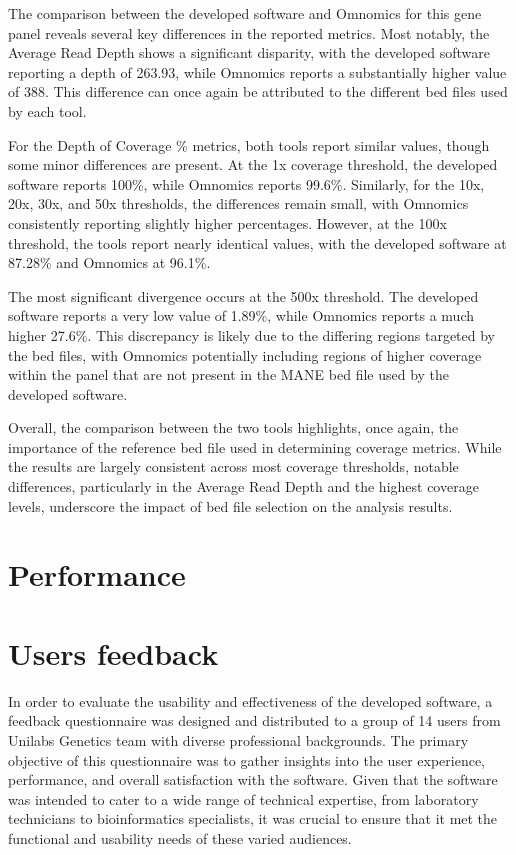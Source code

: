     The comparison between the developed software and Omnomics for this gene panel reveals several key differences in the reported metrics. Most notably, the Average Read Depth shows a significant disparity, with the developed software reporting a depth of 263.93, while Omnomics reports a substantially higher value of 388. This difference can once again be attributed to the different \ac{bed} files used by each tool.
    
    For the Depth of Coverage \% metrics, both tools report similar values, though some minor differences are present. At the 1x coverage threshold, the developed software reports 100\%, while Omnomics reports 99.6\%. Similarly, for the 10x, 20x, 30x, and 50x thresholds, the differences remain small, with Omnomics consistently reporting slightly higher percentages. However, at the 100x threshold, the tools report nearly identical values, with the developed software at 87.28\% and Omnomics at 96.1\%.
    
    The most significant divergence occurs at the 500x threshold. The developed software reports a very low value of 1.89\%, while Omnomics reports a much higher 27.6\%. This discrepancy is likely due to the differing regions targeted by the \ac{bed} files, with Omnomics potentially including regions of higher coverage within the panel that are not present in the MANE \ac{bed} file used by the developed software.
    
    Overall, the comparison between the two tools highlights, once again, the importance of the reference \ac{bed} file used in determining coverage metrics. While the results are largely consistent across most coverage thresholds, notable differences, particularly in the Average Read Depth and the highest coverage levels, underscore the impact of \ac{bed} file selection on the analysis results.
    

\section{Performance}


\section{Users feedback}

In order to evaluate the usability and effectiveness of the developed software, a feedback questionnaire was designed and distributed to a group of 14 users from Unilabs Genetics team with diverse professional backgrounds. The primary objective of this questionnaire was to gather insights into the user experience, performance, and overall satisfaction with the software. Given that the software was intended to cater to a wide range of technical expertise, from laboratory technicians to bioinformatics specialists, it was crucial to ensure that it met the functional and usability needs of these varied audiences.

